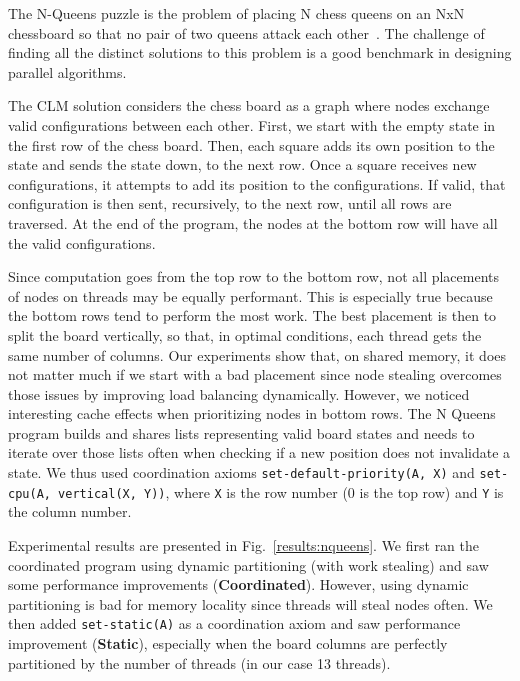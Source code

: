 The N-Queens puzzle is the problem of placing N chess queens on an NxN
chessboard so that no pair of two queens attack each
other~\cite{8queens}. The challenge of finding all the
distinct solutions to this problem is a good benchmark in designing
parallel algorithms.

The CLM solution considers the chess board as a graph where nodes exchange valid
configurations between each other. First, we start with the empty
state in the first row of the chess board. Then, each square adds its own
position to the state and sends the state down, to the next row. Once a square
receives new configurations, it attempts to add its position to the
configurations. If valid, that configuration is then sent, recursively, to the
next row, until all rows are traversed. At the end of the program, the nodes at
the bottom row will have all the valid configurations.

Since computation goes from the top row to the bottom row, not all placements of
nodes on threads may be equally performant. This is especially true because the
bottom rows tend to perform the most work. The best placement is then to split the
board vertically, so that, in optimal conditions, each thread gets the same
number of columns. Our experiments show that, on shared memory, it does not
matter much if we start with a bad placement since node stealing overcomes those
issues by improving load balancing dynamically. However, we noticed interesting
cache effects when prioritizing nodes in bottom rows. The N Queens program
builds and shares lists representing valid board states and needs to iterate
over those lists often when checking if a new position does not invalidate a state.
We thus used coordination axioms \texttt{set-default-priority(A, X)} and \texttt{set-cpu(A,
vertical(X, Y))}, where \texttt{X} is the row number (0 is the top row) and
\texttt{Y} is the column number.

Experimental results are presented in Fig.~\ref{results:nqueens}.
We first ran the coordinated program using dynamic partitioning (with work
stealing) and saw some performance improvements (\textbf{Coordinated}). However, using dynamic
partitioning is bad for memory locality since threads will steal nodes often.
We then added \texttt{set-static(A)} as a coordination axiom and saw
performance improvement (\textbf{Static}), especially when the board columns are perfectly
partitioned by the number of threads (in our case 13 threads).

